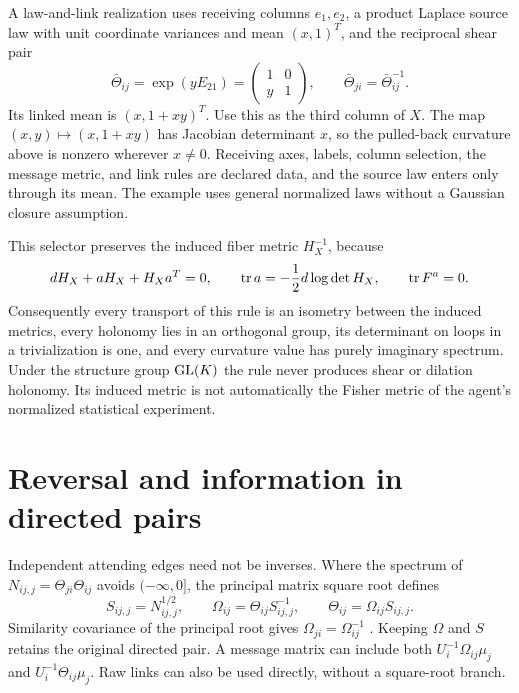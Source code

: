 A law-and-link realization uses receiving columns $e_1,e_2$, a product Laplace source law with unit coordinate variances and mean $(x,1)^T$, and the reciprocal shear pair
\begin{equation}
\bar\Theta_{ij}=\exp(yE_{21})=\begin{pmatrix}1&0\\y&1\end{pmatrix},\qquad
\bar\Theta_{ji}=\bar\Theta_{ij}^{-1}.
\end{equation}
Its linked mean is $(x,1+xy)^T$. Use this as the third column of $X$. The map $(x,y)\mapsto(x,1+xy)$ has Jacobian determinant $x$, so the pulled-back curvature above is nonzero wherever $x\ne0$. Receiving axes, labels, column selection, the message metric, and link rules are declared data, and the source law enters only through its mean. The example uses general normalized laws without a Gaussian closure assumption.

This selector preserves the induced fiber metric $H_X^{-1}$, because
\begin{equation}
dH_X+aH_X+H_Xa^T=0,\qquad
\operatorname{tr} a=-\frac12 d\log\det H_X,\qquad \operatorname{tr} F^a=0.
\end{equation}
Consequently every transport of this rule is an isometry between the induced metrics, every holonomy lies in an orthogonal group, its determinant on loops in a trivialization is one, and every curvature value has purely imaginary spectrum. Under the structure group $\mathrm{GL}(K)$ the rule never produces shear or dilation holonomy. Its induced metric is not automatically the Fisher metric of the agent's normalized statistical experiment.

\section{Reversal and information in directed pairs}

Independent attending edges need not be inverses. Where the spectrum of $N_{ij,j}=\Theta_{ji}\Theta_{ij}$ avoids $(-\infty,0]$, the principal matrix square root defines
\begin{equation}
S_{ij,j}=N_{ij,j}^{1/2},\qquad
\Omega_{ij}=\Theta_{ij}S_{ij,j}^{-1},\qquad
\Theta_{ij}=\Omega_{ij}S_{ij,j}.
\label{comp:ibt:backtrack}
\end{equation}
Similarity covariance of the principal root gives $\Omega_{ji}=\Omega_{ij}^{-1}$ \citep{Higham2008}. Keeping $\Omega$ and $S$ retains the original directed pair. A message matrix can include both $U_i^{-1}\Omega_{ij}\mu_j$ and $U_i^{-1}\Theta_{ij}\mu_j$. Raw links can also be used directly, without a square-root branch.

